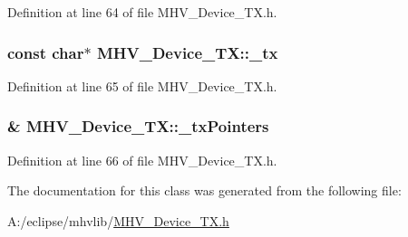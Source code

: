 Definition at line 64 of file M\-H\-V\-\_\-\-Device\-\_\-\-T\-X.\-h.

\hypertarget{class_m_h_v___device___t_x_ace8827a700dcc1a6a54e0bf80906085c}{
\subsubsection[{\-\_\-tx}]{\setlength{\rightskip}{0pt plus 5cm}const char$\ast$ M\-H\-V\-\_\-\-Device\-\_\-\-T\-X\-::\-\_\-tx\hspace{0.3cm}{\ttfamily [protected]}}}\label{class_m_h_v___device___t_x_ace8827a700dcc1a6a54e0bf80906085c}


Definition at line 65 of file M\-H\-V\-\_\-\-Device\-\_\-\-T\-X.\-h.

\hypertarget{class_m_h_v___device___t_x_a36768491def5fdb4936e918c0ea097cd}{
\subsubsection[{\-\_\-tx\-Pointers}]{\& M\-H\-V\-\_\-\-Device\-\_\-\-T\-X\-::\-\_\-tx\-Pointers\hspace{0.3cm}{\ttfamily [protected]}}}\label{class_m_h_v___device___t_x_a36768491def5fdb4936e918c0ea097cd}


Definition at line 66 of file M\-H\-V\-\_\-\-Device\-\_\-\-T\-X.\-h.



The documentation for this class was generated from the following file\-:\begin{DoxyCompactItemize}
\item 
A\-:/eclipse/mhvlib/\hyperlink{_m_h_v___device___t_x_8h}{M\-H\-V\-\_\-\-Device\-\_\-\-T\-X.\-h}\end{DoxyCompactItemize}
